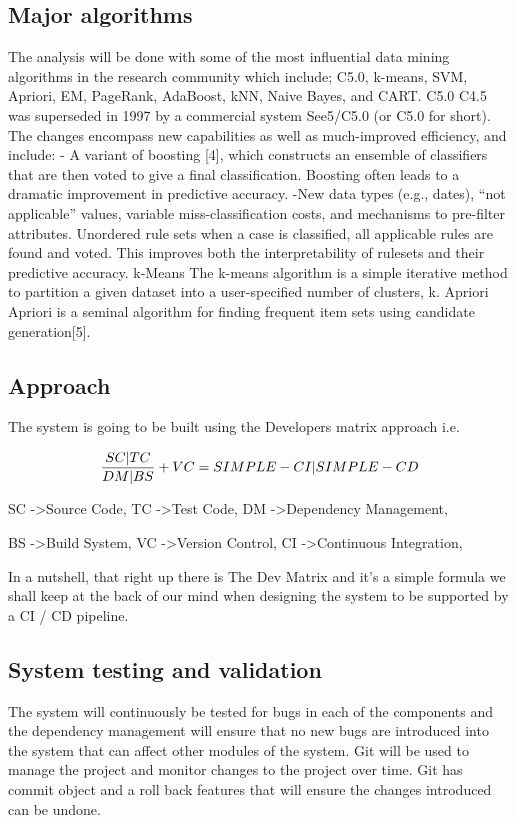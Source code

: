 \documentclass[a4paper,12pt]{article}
\begin{document}
\subsection{Major algorithms}
The analysis will be done with some of the most influential data mining algorithms in the research community which include; 
C5.0, k-means, SVM, Apriori, EM, PageRank, AdaBoost, kNN, Naive Bayes, and CART. 
C5.0
C4.5 was superseded in 1997 by a commercial system See5/C5.0 (or C5.0 for short). The changes encompass new capabilities as well as much-improved efficiency, and include:
- A variant of boosting [4], which constructs an ensemble of classifiers that are then voted to give a final classification. Boosting often leads to a dramatic improvement in predictive accuracy.
-New data types (e.g., dates), “not applicable” values, variable miss-classification costs, and mechanisms to pre-filter attributes.
 Unordered rule sets when a case is classified, all applicable rules are found and voted. This improves both the interpretability of rulesets and their predictive accuracy.
k-Means The k-means algorithm is a simple iterative method to partition a given dataset into a user-specified number of clusters, k.
Apriori
Apriori is a seminal algorithm for finding frequent item sets using candidate generation[5].

\subsection{Approach}

The system is going to be built using the Developers matrix approach i.e.




\[ \frac{SC | TC } {DM | BS } +  \\ VC = \\ SIMPLE-CI | SIMPLE-CD \]

\par
SC -\textgreater Source Code, TC -\textgreater Test Code, DM -\textgreater Dependency Management,
\par
BS -\textgreater Build System, VC -\textgreater Version Control, CI -\textgreater Continuous Integration,
\par
In a nutshell, that right up there is The Dev Matrix and it’s a simple formula we shall keep
at the back of our mind when  designing the system to be supported by a CI / CD pipeline.

\subsection{System testing and validation}
The system will continuously be tested for bugs in each of the components and the dependency management will ensure that no new bugs are introduced into the system that can affect other modules of the system. Git will be used to manage the project and monitor changes to the project over time. Git has commit object and a roll back features that will ensure the changes introduced can be undone.
\end{document}
